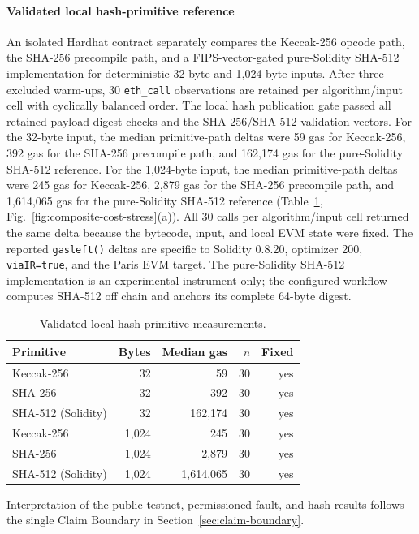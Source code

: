 \documentclass[journal]{IEEEtran}
\newif\ifshowrevisions
\newcommand{\rev}[1]{{\ifshowrevisions\color{blue}\else\color{black}\fi #1}}
\begin{document}
\paragraph{Validated local hash-primitive reference}
An isolated Hardhat contract separately compares the Keccak-256 opcode path,
the SHA-256 precompile path, and a FIPS-vector-gated pure-Solidity SHA-512
implementation for deterministic 32-byte and 1{,}024-byte inputs. After three
excluded warm-ups, 30 \texttt{eth\_call} observations are retained per
algorithm/input cell with cyclically balanced order. The local hash
publication gate passed all retained-payload digest checks and the
SHA-256/SHA-512 validation vectors. For the 32-byte input, the median
primitive-path deltas were 59 gas for Keccak-256, 392 gas for the SHA-256
precompile path, and 162{,}174 gas for the pure-Solidity SHA-512 reference.
For the 1{,}024-byte input, the median primitive-path deltas were 245 gas for
Keccak-256, 2{,}879 gas for the SHA-256 precompile path, and 1{,}614{,}065 gas
for the pure-Solidity SHA-512 reference
(Table~\ref{tab:hash-primitive-microbenchmark},
Fig.~\ref{fig:composite-cost-stress}(a)). All 30 calls per
algorithm/input cell returned the same delta because the bytecode, input, and
local EVM state were fixed. The reported \texttt{gasleft()} deltas are
specific to Solidity 0.8.20, optimizer 200, \texttt{viaIR=true}, and the Paris
EVM target. The pure-Solidity SHA-512 implementation is an experimental
instrument only; the \rev{configured} workflow computes SHA-512 off chain and
anchors its complete 64-byte digest.
\begin{table}[!t]
\centering
\caption{Validated local hash-primitive measurements.}
\label{tab:hash-primitive-microbenchmark}
\small
\begin{tabular}{lrrrr}
\toprule
Primitive & Bytes & Median gas & $n$ & Fixed \\
\midrule
Keccak-256 & 32 & 59 & 30 & yes \\
SHA-256 & 32 & 392 & 30 & yes \\
SHA-512 (Solidity) & 32 & 162{,}174 & 30 & yes \\
Keccak-256 & 1{,}024 & 245 & 30 & yes \\
SHA-256 & 1{,}024 & 2{,}879 & 30 & yes \\
SHA-512 (Solidity) & 1{,}024 & 1{,}614{,}065 & 30 & yes \\
\bottomrule
\end{tabular}
\end{table}
Interpretation of the public-testnet, permissioned-fault, and hash results
follows the single Claim Boundary in Section~\ref{sec:claim-boundary}.
\end{document}
